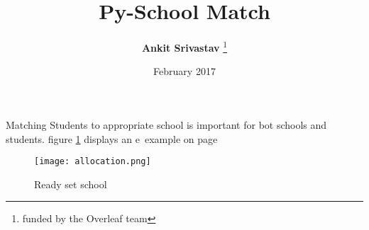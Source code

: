 \documentclass[12pt, letterpaper]{article}
\title{\textbf{Py-School Match}}
\author{\textbf{Ankit Srivastav} \thanks{funded by the Overleaf team}}
\date{February 2017}
\begin{document}
\maketitle



Matching Students to appropriate school is important for bot schools and students. figure \ref{fig:mesh1} displays an e\
example on page \pageref{fig:mesh1}



\begin{figure}[h]

    \centering

    \texttt{[image: allocation.png]}

    \caption{Ready set school}

    \label{fig:mesh1}

\end{figure}
\end{document}
